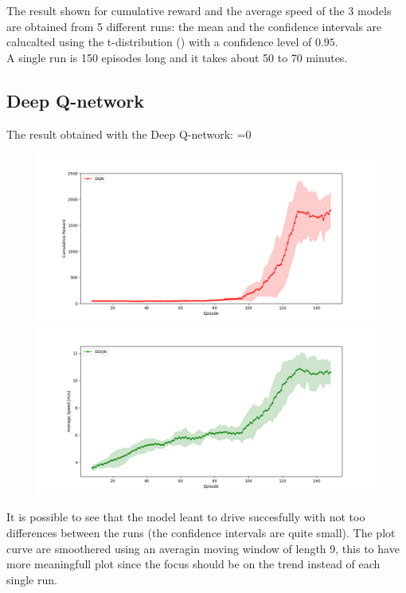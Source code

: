 \documentclass[14pt]{extarticle}
\def\sp{\vspace{5pt}}
\def\pp{\vspace{10pt}\newline}
\newcounter{debug}
\begin{document}
\begin{flushleft}
The result shown for cumulative reward and the average speed of the 3 models are obtained from 5 different runs: the mean and the confidence intervals are calucalted using the t-distribution (\cite{Tdistri}) with a confidence level of $0.95$. \\
A single run is 150 episodes long and it takes about 50 to 70 minutes.

\subsection{Deep Q-network}
\sp
The result obtained with the Deep Q-network:
\vspace{-5mm}
\ifnum\value{debug}=0 {
	\begin{figure}[H]
    		\centering\includegraphics[width=1\textwidth]{./Image/Results/D/plot0_reward.png}
    		\vspace{-5mm}
    		\centering\includegraphics[width=1\textwidth]{./Image/Results/D/plot0_speed.png}
	\end{figure}
	}\fi
It is possible to see that the model leant to drive succesfully with not too differences between the runs (the confidence intervals are quite small).
\pp
The plot curve are smoothered using an averagin moving window of length 9, this to have more meaningfull plot since the focus should be on the trend instead of each single run.


\end{flushleft}
\end{document}
